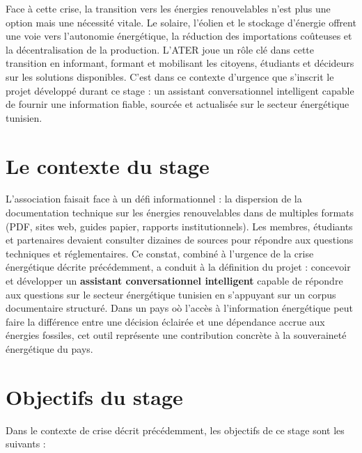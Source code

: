 \documentclass[12pt,a4paper,oneside]{report}
\begin{document}
Face \`{a} cette crise, la transition vers les \'{e}nergies renouvelables n'est plus une option mais une n\'{e}cessit\'{e} vitale. Le solaire, l'\'{e}olien et le stockage d'\'{e}nergie offrent une voie vers l'autonomie \'{e}nerg\'{e}tique, la r\'{e}duction des importations co\^{u}teuses et la d\'{e}centralisation de la production. L'ATER joue un r\^{o}le cl\'{e} dans cette transition en informant, formant et mobilisant les citoyens, \'{e}tudiants et d\'{e}cideurs sur les solutions disponibles. C'est dans ce contexte d'urgence que s'inscrit le projet d\'{e}velopp\'{e} durant ce stage : un assistant conversationnel intelligent capable de fournir une information fiable, sourc\'{e}e et actualis\'{e}e sur le secteur \'{e}nerg\'{e}tique tunisien.



\section{Le contexte du stage}



L'association faisait face \`{a} un d\'{e}fi informationnel : la dispersion de la documentation technique sur les \'{e}nergies renouvelables dans de multiples formats (PDF, sites web, guides papier, rapports institutionnels). Les membres, \'{e}tudiants et partenaires devaient consulter dizaines de sources pour r\'{e}pondre aux questions techniques et r\'{e}glementaires. Ce constat, combin\'{e} \`{a} l'urgence de la crise \'{e}nerg\'{e}tique d\'{e}crite pr\'{e}c\'{e}demment, a conduit \`{a} la d\'{e}finition du projet : concevoir et d\'{e}velopper un \textbf{assistant conversationnel intelligent} capable de r\'{e}pondre aux questions sur le secteur \'{e}nerg\'{e}tique tunisien en s'appuyant sur un corpus documentaire structur\'{e}. Dans un pays o\`{o} l'acc\`{e}s \`{a} l'information \'{e}nerg\'{e}tique peut faire la diff\'{e}rence entre une d\'{e}cision \'{e}clair\'{e}e et une d\'{e}pendance accrue aux \'{e}nergies fossiles, cet outil repr\'{e}sente une contribution concr\`{e}te \`{a} la souverainet\'{e} \'{e}nerg\'{e}tique du pays.



\section{Objectifs du stage}



Dans le contexte de crise d\'{e}crit pr\'{e}c\'{e}demment, les objectifs de ce stage sont les suivants :
\end{document}
